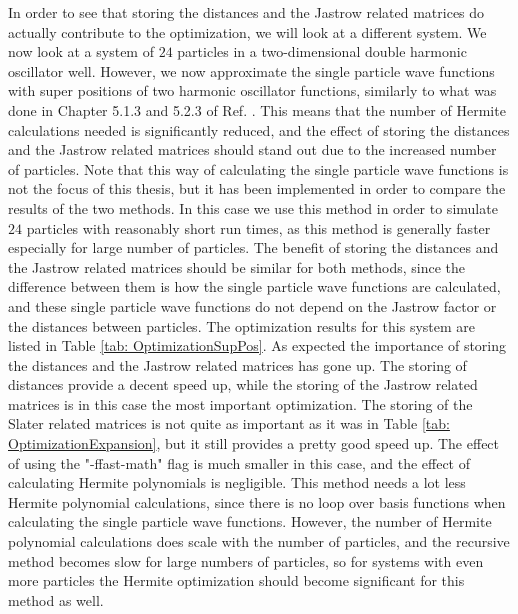 \documentclass[../main.tex]{subfiles}
\begin{document}
In order to see that storing the distances and the Jastrow related matrices do actually contribute to the optimization, we will look at a different system. We now look at a system of $24$ particles in a two-dimensional double harmonic oscillator well. However, we now approximate the single particle wave functions with super positions of two harmonic oscillator functions, similarly to what was done in Chapter 5.1.3 and 5.2.3 of Ref. \cite{Jorgen}. This means that the number of Hermite calculations needed is significantly reduced, and the effect of storing the distances and the Jastrow related matrices should stand out due to the increased number of particles. Note that this way of calculating the single particle wave functions is not the focus of this thesis, but it has been implemented in order to compare the results of the two methods. In this case we use this method in order to simulate $24$ particles with reasonably short run times, as this method is generally faster especially for large number of particles. The benefit of storing the distances and the Jastrow related matrices should be similar for both methods, since the difference between them is how the single particle wave functions are calculated, and these single particle wave functions do not depend on the Jastrow factor or the distances between particles. The optimization results for this system are listed in Table \ref{tab: OptimizationSupPos}. As expected the importance of storing the distances and the Jastrow related matrices has gone up. The storing of distances provide a decent speed up, while the storing of the Jastrow related matrices is in this case the most important optimization. The storing of the Slater related matrices is not quite as important as it was in Table \ref{tab: OptimizationExpansion}, but it still provides a pretty good speed up. The effect of using the "-ffast-math" flag is much smaller in this case, and the effect of calculating Hermite polynomials is negligible. This method needs a lot less Hermite polynomial calculations, since there is no loop over basis functions when calculating the single particle wave functions. However, the number of Hermite polynomial calculations does scale with the number of particles, and the recursive method becomes slow for large numbers of particles, so for systems with even more particles the Hermite optimization should become significant for this method as well.
\end{document}
